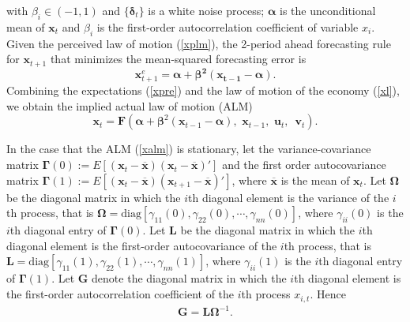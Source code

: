 with $\beta_i\in(-1,1)$ and $\{\pmb\delta_t\}$ is a white noise process; $\pmb\alpha$ is the
unconditional mean of $\pmb x_t$ and $\beta_i$ is the first-order
autocorrelation coefficient of variable $x_i$. Given the perceived law
of motion (\ref{xplm}), the 2-period ahead forecasting rule for
$\pmb x_{t+1}$ that minimizes the mean-squared forecasting error is
\begin{equation}\label{xpre}
\pmb x^e_{t+1}=\pmb{\alpha+\beta^2(x_{t-1}-\alpha)}.
\end{equation}
Combining the expectations (\ref{xpre}) and the law of motion of the
economy (\ref{xl}), we obtain the implied actual law of motion (ALM)
\begin{equation}\label{xalm}
{\pmb x}_t={\pmb F}({\pmb\alpha}+{\pmb\beta}^2({\pmb x}_{t-1}-{\pmb\alpha}), \,\,{\pmb x}_{t-1},\,\,{\pmb u}_t,\,\,\,{\pmb v}_t).
\end{equation}

In the case that the ALM (\ref{xalm}) is stationary, let the variance-covariance matrix  ${\pmb\Gamma}(0):=E[({\pmb x}_t-{\pmb{\overline x}})({\pmb x}_{t}-{\pmb{\overline x}})']$ and the first order autocovariance matrix ${\pmb\Gamma}(1):=E[({\pmb x}_t-{\pmb{\overline x}})({\pmb x}_{t+1}-{\pmb{\overline x}})']$, where $\overline{\pmb x}$ is the mean of ${\pmb x}_t$. Let ${\pmb \Omega}$ be the diagonal matrix in which the $i$th diagonal element is the variance of the $i$th process, that is ${\pmb \Omega}=\mbox{diag}[\gamma_{11}(0), \gamma_{22}(0), \cdots, \gamma_{nn}(0)]$, where $\gamma_{ii}(0)$ is the $i$th diagonal entry of ${\pmb\Gamma}(0)$. Let ${\pmb L}$ be the diagonal matrix in which the $i$th diagonal element is the first-order autocovariance of the $i$th process, that is ${\pmb L}=\mbox{diag}[\gamma_{11}(1), \gamma_{22}(1), \cdots, \gamma_{nn}(1)]$, where $\gamma_{ii}(1)$ is the $i$th diagonal entry of ${\pmb\Gamma}(1)$. Let ${\pmb G}$ denote the diagonal matrix in which the $i$th diagonal element is the first-order autocorrelation coefficient of the $i$th process $x_{i,t}$. Hence
\begin{eqnarray}\label{corrG}
{\pmb G}={\pmb L}{\pmb \Omega}^{-1}.
\end{eqnarray}


